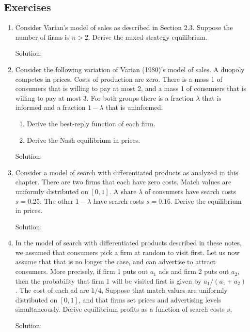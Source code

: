 \subsection{Exercises}
\begin{enumerate}
	\item Consider Varian's model of sales as described in Section 2.3.
	      Suppose the number of firms is $n>2$. Derive the mixed strategy
	      equilibrium.

	      Solution:
	\item Consider the following variation of Varian (1980)’s model of sales.
	      A duopoly
	      competes in prices. Costs of production are zero. There is a mass 1 of consumers
	      that is willing to pay at most 2, and a mass 1 of consumers that is willing to pay at
	      most 3. For both groups there is a fraction $\lambda$ that is informed and a fraction $1-\lambda$
	      that is uninformed.
	      \begin{enumerate}
		      \item Derive the best-reply function of each firm.
		      \item Derive the Nash equilibrium in prices.
	      \end{enumerate}

	      Solution:
	\item Consider a model of search with differentiated products as analyzed in this chapter. 
	      There are two firms that each have zero costs. Match values are uniformly
	      distributed on $[0, 1]$. A share $\lambda$ of consumers have search costs $s = 0.25$. The other
	      $1-\lambda$ have search costs $s=0.16$. Derive the equilibrium in prices.

	      Solution:
	\item In the model of search with differentiated products described in these notes, we
	      assumed that consumers pick a firm at random to visit first. Let us now assume that
	      that is no longer the case, and can advertise to attract consumers. More precisely,
	      if firm 1 puts out $a_1$ ads and firm 2 puts out $a_2$, then the probability that firm 1
	      will be visited first is given by $a_1/(a_1 + a_2)$. The cost of each ad are $1/4$,
	      Suppose that match values are uniformly distributed on $[0,1]$, and that firms set
	      prices and advertising levels simultaneously. Derive equilibrium profits as a function
	      of search costs $s$.

	      Solution:
\end{enumerate}
